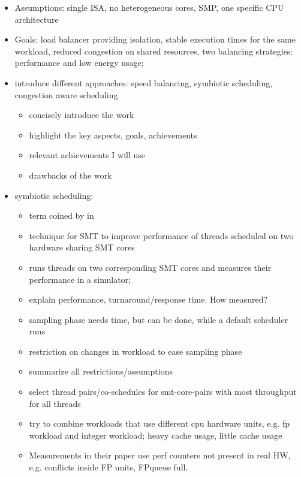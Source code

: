 \begin{itemize}
  \item Assumptions: single ISA, no heterogeneous cores, SMP, one specific CPU
    architecture \checkmark
  \item Goals: load balancer providing isolation, stable execution times for the
    same workload, reduced congestion on shared resources, two balancing
    strategies: performance and low energy usage;
  \item introduce different approaches: speed balancing, symbiotic scheduling,
    congestion aware scheduling

    \begin{itemize}
      \item concisely introduce the work
      \item highlight the key aspects, goals, achievements
      \item relevant achievements I will use
      \item drawbacks of the work
    \end{itemize}
  \item symbiotic scheduling:
    \begin{itemize}
      \item term coined by \citeauthor{snavely_symbiotic_2000} in
	\citeyear{snavely_symbiotic_2000} \checkmark
      \item technique for SMT to improve performance of threads scheduled on
	two hardware sharing SMT cores \checkmark
      \item runs threads on two corresponding SMT cores and measures their
	performance in a simulator;
      \item explain performance, turnaround/response time. How measured?
	\checkmark
      \item sampling phase needs time, but can be done, while a default
	scheduler runs \checkmark
      \item restriction on changes in workload to ease sampling phase
      \item summarize all restrictions/assumptions
      \item select thread pairs/co-schedules for smt-core-pairs with most throughput for
	all threads
      \item try to combine workloads that use different cpu hardware
	units, e.g. fp workload and integer workload; heavy cache usage, little
	cache usage
      \item Measurements in their \citeyear{snavely_symbiotic_2000} paper use
	perf counters not present in real HW, e.g. conflicts inside FP units,
	FPqueue full.


\end{itemize}
\end{itemize}
